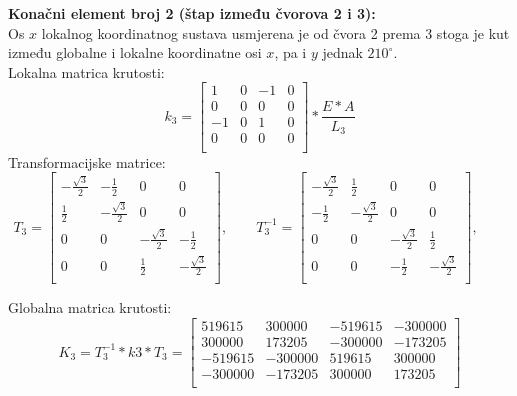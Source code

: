 \documentclass[a4paper,twoside,12pt]{memoir} %
\begin{document}
\textbf{Konačni element broj 2 (štap između čvorova 2 i 3):} \\
Os $x$ lokalnog koordinatnog sustava usmjerena je od čvora 2 prema 3 stoga je kut između globalne i lokalne koordinatne osi $x$, pa i $y$ jednak $210^\circ$. \\
Lokalna matrica krutosti:
\begin{equation}
    k_3 = 
    \begin{bmatrix}
    1 & 0 & -1 & 0 \\
    0 & 0 & 0 & 0 \\
    -1 & 0 & 1 & 0 \\
    0 & 0 & 0 & 0 \\
    \end{bmatrix} * \frac{E * A}{L_3}
\end{equation}
Transformacijske matrice:
\begin{equation}
    T_3 =
    \begin{bmatrix}
    -\frac{\sqrt{3}}{2} & -\frac{1}{2} & 0 & 0 \\
    \frac{1}{2} & -\frac{\sqrt{3}}{2} & 0 & 0 \\
    0 & 0 & -\frac{\sqrt{3}}{2} & -\frac{1}{2} \\
    0 & 0 & \frac{1}{2} & -\frac{\sqrt{3}}{2} \\
    \end{bmatrix}, \qquad
    T^{-1}_3 =
    \begin{bmatrix}
    -\frac{\sqrt{3}}{2} & \frac{1}{2} & 0 & 0 \\
    -\frac{1}{2} & -\frac{\sqrt{3}}{2} & 0 & 0 \\
    0 & 0 & -\frac{\sqrt{3}}{2} & \frac{1}{2} \\
    0 & 0 & -\frac{1}{2} & -\frac{\sqrt{3}}{2} \\
    \end{bmatrix}, \qquad
\end{equation}

Globalna matrica krutosti:
\begin{equation}
    K_3 = T^{-1}_3 * k3 * T_3 =
    \begin{bmatrix}
    519615 & 300000 & -519615 & -300000 \\
    300000 & 173205 & -300000 & -173205 \\
    -519615 & -300000 & 519615 & 300000 \\
    -300000 & -173205 & 300000 & 173205 \\
    \end{bmatrix}
\end{equation}
\end{document}
